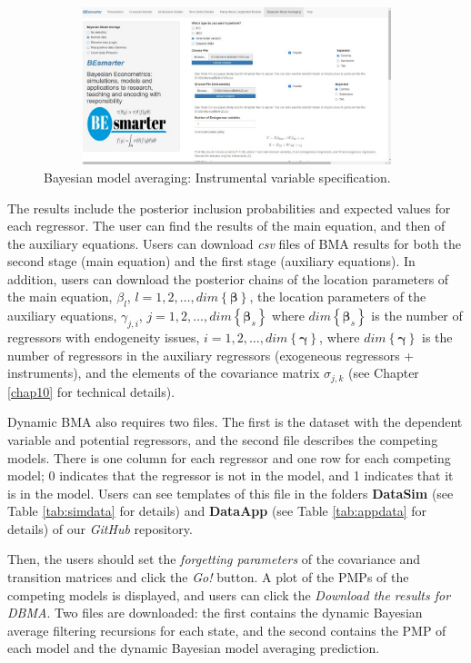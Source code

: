 \begin{figure}
	\includegraphics[width=340pt, height=130pt]{Chapters/chapterGUI/figures/Figure10.jpg}
	\caption[List of figure caption goes here]{Bayesian model averaging: Instrumental variable specification.}\label{fig610}
\end{figure} 

The results include the posterior inclusion probabilities and expected values for each regressor. The user can find the results of the main equation, and then of the auxiliary equations. Users can download \textit{csv} files of BMA results for both the second stage (main equation) and the first stage (auxiliary equations). In addition, users can download the posterior chains of the location parameters of the main equation, $\beta_{l}$, $l=1,2,\dots,dim\left\{\bm{\beta}\right\}$, the location parameters of the auxiliary equations, $\gamma_{j,i}$, $j=1,2,\dots,dim\left\{\bm{\beta}_s\right\}$ where $dim\left\{\bm{\beta}_s\right\}$ is the number of regressors with endogeneity issues, $i=1,2,\dots,dim\left\{\bm{\gamma}\right\}$, where $dim\left\{\bm{\gamma}\right\}$ is the number of regressors in the auxiliary regressors (exogeneous regressors + instruments), and the elements of the covariance matrix $\sigma_{j,k}$ (see Chapter \ref{chap10} for technical details).

Dynamic BMA also requires two files. The first is the dataset with the dependent variable and potential regressors, and the second file describes the competing models. There is one column for each regressor and one row for each competing model; 0 indicates that the regressor is not in the model, and 1 indicates that it is in the model. Users can see templates of this file in the folders \textbf{DataSim} (see Table \ref{tab:simdata} for details) and \textbf{DataApp} (see Table \ref{tab:appdata} for details) of our \textit{GitHub} repository.

Then, the users should set the \textit{forgetting parameters} of the covariance and transition matrices and click the \textit{Go!} button. A plot of the PMPs of the competing models is displayed, and users can click the \textit{Download the results for DBMA}. Two files are downloaded: the first contains the dynamic Bayesian average filtering recursions for each state, and the second contains the PMP of each model and the dynamic Bayesian model averaging prediction.

